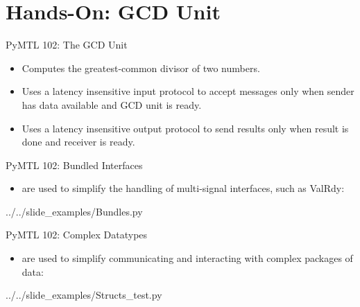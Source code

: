 
\section[Hands-On: GCD Unit]{Hands-On: GCD Unit}

\begin{frame}{PyMTL 102: The GCD Unit}
\begin{itemize}
  \item Computes the greatest-common divisor of two numbers.
  \smallskip
  \item Uses a latency insensitive input protocol to accept messages only
        when sender has data available and GCD unit is ready.
  \smallskip
  \item Uses a latency insensitive output protocol to send results only
        when result is done and receiver is ready.
\end{itemize}

\end{frame}

\begin{frame}{PyMTL 102: Bundled Interfaces}

\begin{itemize}
  \item {} are used to simplify the handling of multi-signal
        interfaces, such as ValRdy:
\end{itemize}

\vspace{-0.15in}

{../../slide_examples/Bundles.py}

\end{frame}

\begin{frame}{PyMTL 102: Complex Datatypes}

\begin{itemize}
  \item {} are used to simplify communicating and interacting
        with complex packages of data:
\end{itemize}

\vspace{-0.15in}

{../../slide_examples/Structs_test.py}

\end{frame}


